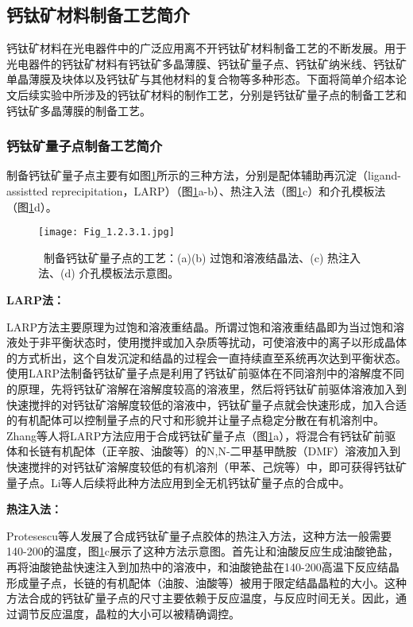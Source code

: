 \documentclass[forlib]{WHUMaster}   %
\begin{document}
\subsection{钙钛矿材料制备工艺简介}

{\songti{}钙钛矿材料在光电器件中的广泛应用离不开钙钛矿材料制备工艺的不断发展。用于光电器件的钙钛矿材料有钙钛矿多晶薄膜、钙钛矿量子点、钙钛矿纳米线、钙钛矿单晶薄膜及块体以及钙钛矿与其他材料的复合物等多种形态。下面将简单介绍本论文后续实验中所涉及的钙钛矿材料的制作工艺，分别是钙钛矿量子点的制备工艺和钙钛矿多晶薄膜的制备工艺。

\subsubsection{钙钛矿量子点制备工艺简介}%

制备钙钛矿量子点主要有如图\ref{fig:1.2.3.1}所示的三种方法，分别是配体辅助再沉淀（ligand-assistted reprecipitation，LARP）（图\ref{fig:1.2.3.1}a-b）、热注入法（图\ref{fig:1.2.3.1}c）和介孔模板法（图\ref{fig:1.2.3.1}d）。

\begin{figure}[ht]
\centering
  \texttt{[image: Fig\_1.2.3.1.jpg]}
  \caption{\rm \ 制备钙钛矿量子点的工艺：(a)(b) 过饱和溶液结晶法\cite{RN10,RN76}、(c) 热注入法\cite{RN77}、(d) 介孔模板法示意图\cite{RN80}。}
  \label{fig:1.2.3.1}
\end{figure}

\textbf{LARP法：}

LARP方法主要原理为过饱和溶液重结晶。所谓过饱和溶液重结晶即为当过饱和溶液处于非平衡状态时，使用搅拌或加入杂质等扰动，可使溶液中的离子以形成晶体的方式析出，这个自发沉淀和结晶的过程会一直持续直至系统再次达到平衡状态\cite{RN76}。使用LARP法制备钙钛矿量子点是利用了钙钛矿前驱体在不同溶剂中的溶解度不同的原理，先将钙钛矿溶解在溶解度较高的溶液里，然后将钙钛矿前驱体溶液加入到快速搅拌的对钙钛矿溶解度较低的溶液中，钙钛矿量子点就会快速形成，加入合适的有机配体可以控制量子点的尺寸和形貌并让量子点稳定分散在有机溶剂中\cite{RN76,RN33}。Zhang等人将LARP方法应用于合成钙钛矿量子点（图\ref{fig:1.2.3.1}a），将混合有钙钛矿前驱体和长链有机配体（正辛胺、油酸等）的N,N-二甲基甲酰胺（DMF）溶液加入到快速搅拌的对钙钛矿溶解度较低的有机溶剂（甲苯、己烷等）中，即可获得钙钛矿量子点\cite{RN10}。Li等人后续将此种方法应用到全无机钙钛矿量子点的合成中\cite{RN76}。

\textbf{热注入法：}

Protesescu等人发展了合成钙钛矿量子点胶体的热注入方法，这种方法一般需要140-200{\textcelsius}的温度\cite{RN60}，图\ref{fig:1.2.3.1}c展示了这种方法示意图。首先让和油酸反应生成油酸铯盐，再将油酸铯盐快速注入到加热中的溶液中，和油酸铯盐在140-200{\textcelsius}高温下反应结晶形成量子点，长链的有机配体（油胺、油酸等）被用于限定结晶晶粒的大小。这种方法合成的钙钛矿量子点的尺寸主要依赖于反应温度，与反应时间无关。因此，通过调节反应温度，晶粒的大小可以被精确调控。

}
\end{document}
